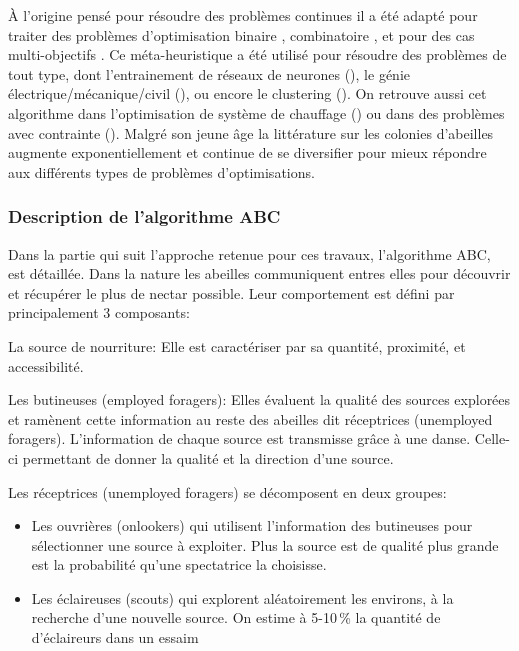 À l’origine pensé pour résoudre des problèmes continues il a été adapté pour traiter des problèmes
d’optimisation binaire \cite{Kashan2012342}, combinatoire \cite{Karaboga20113021}, et pour des cas multi-objectifs
\cite{Akbari201239,Omkar2011489}.
Ce méta-heuristique a été utilisé pour résoudre des problèmes de tout type, dont l’entrainement de réseaux de
neurones (\cite{Karaboga2007}), le génie électrique/mécanique/civil (\cite{Rao2009887}), ou encore le clustering (\cite{Zhang20104761}).
On retrouve aussi cet algorithme dans l’optimisation de système de chauffage (\cite{Atashkari2011}) ou dans des problèmes avec
contrainte (\cite{Tsai201480,Karaboga20113021}).
Malgré son jeune âge la littérature sur les colonies d’abeilles augmente exponentiellement et continue de se diversifier
pour mieux répondre aux différents types de problèmes d’optimisations.


\subsubsection{Description de l’algorithme ABC} %
\label{ssub:description_de_l_algorithme_abc}

Dans la partie qui suit l’approche retenue pour ces travaux, l’algorithme ABC, est détaillée.
Dans la nature les abeilles communiquent entres elles pour découvrir et récupérer le plus
de nectar possible. Leur comportement est défini par principalement 3 composants:
\begin{description}
    \item La source de nourriture: Elle est caractériser par sa quantité, proximité, et accessibilité.
    \item Les butineuses (employed foragers): Elles évaluent la qualité des sources explorées et ramènent cette information
          au reste des abeilles dit réceptrices (unemployed foragers). L’information de chaque source est transmisse
          grâce à une danse. Celle-ci permettant de donner la qualité et la direction d’une source.
    \item Les réceptrices (unemployed foragers) se décomposent en deux groupes:
    \begin{itemize}
        \item Les ouvrières (onlookers) qui utilisent l’information des butineuses pour sélectionner une source à exploiter.
              Plus la source est de qualité plus grande est la probabilité qu’une spectatrice la choisisse.
        \item Les éclaireuses (scouts) qui explorent aléatoirement les environs, à la recherche d’une nouvelle source. On estime à
        5-10\,\% la quantité de d’éclaireurs dans un essaim \cite{Seeley1996}
    \end{itemize}
\end{description}

